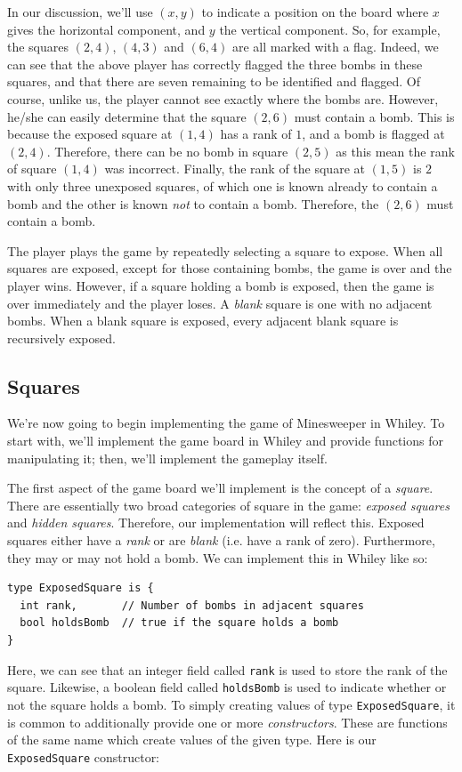 In our discussion, we'll use $(x,y)$ to indicate a position on the board where $x$ gives the horizontal component, and $y$ the vertical component.  So, for example, the squares $(2,4)$, $(4,3)$ and $(6,4)$ are all marked with a flag.  Indeed, we can see that the above player has correctly flagged the three bombs in these squares, and that there are seven remaining to be identified and flagged.  Of course, unlike us, the player cannot see exactly where the bombs are.  However, he/she can easily determine that the square $(2,6)$ must contain a bomb.  This is because the exposed square at $(1,4)$ has a rank of $1$, and a bomb is flagged at $(2,4)$.  Therefore, there can be no bomb in square $(2,5)$ as this mean the rank of square $(1,4)$ was incorrect.  Finally, the rank of the square at $(1,5)$ is $2$ with only three unexposed squares, of which one is known already to contain a bomb and the other is known {\em not} to contain a bomb.  Therefore, the $(2,6)$ must contain a bomb.

The player plays the game by repeatedly selecting a square to expose.  When all squares are exposed, except for those containing bombs, the game is over and the player wins.  However, if a square holding a bomb is exposed, then the game is over immediately and the player loses.  A {\em blank} square is one with no adjacent bombs.  When a blank square is exposed, every adjacent blank square is recursively exposed.

\subsection{Squares}
We're now going to begin implementing the game of Minesweeper in Whiley.  To start with, we'll implement the game board in Whiley and provide functions for manipulating it; then, we'll implement the gameplay itself.  

The first aspect of the game board we'll implement is the concept of a {\em square}.  There are essentially two broad categories of square in the game: {\em exposed squares} and {\em hidden squares}.  Therefore, our implementation will reflect this.  Exposed squares either have a {\em rank} or are {\em blank} (i.e. have a rank of zero).  Furthermore, they may or may not hold a bomb.  We can implement this in Whiley like so:
\begin{lstlisting}
type ExposedSquare is { 
  int rank,       // Number of bombs in adjacent squares
  bool holdsBomb  // true if the square holds a bomb
}
\end{lstlisting}
Here, we can see that an integer field called \lstinline{rank} is used to store the rank of the square.  Likewise, a boolean field called \lstinline{holdsBomb} is used to indicate whether or not the square holds a bomb.  To simply creating values of type \lstinline{ExposedSquare}, it is common to additionally provide one or more {\em constructors}.  These are functions of the same name which create values of the given type.  Here is our \lstinline{ExposedSquare} constructor:

